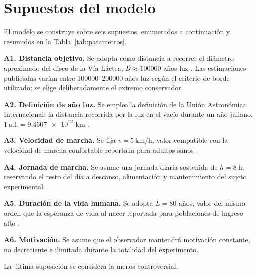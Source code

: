 \documentclass[conference]{IEEEtran}
\begin{document}
\section{Supuestos del modelo}
\label{sec:supuestos}

El modelo se construye sobre seis supuestos, enumerados a continuación y
resumidos en la Tabla~\ref{tab:parametros}.

\textbf{A1. Distancia objetivo.} Se adopta como distancia a recorrer el
diámetro aproximado del disco de la Vía Láctea, $D \approx \num{100000}$ años
luz \cite{nasa_mw,goodwin}. Las estimaciones publicadas varían entre
\numrange{100000}{200000} años luz según el criterio de borde utilizado;
se elige deliberadamente el extremo conservador.

\textbf{A2. Definición de año luz.} Se emplea la definición de la Unión
Astronómica Internacional: la distancia recorrida por la luz en el vacío
durante un año juliano, $1\ \text{a.l.} = \num{9.4607e12}$ km
\cite{iau_style}.

\textbf{A3. Velocidad de marcha.} Se fija $v = \qty{5}{\kilo\meter\per\hour}$,
valor compatible con la velocidad de marcha confortable reportada para adultos
sanos \cite{bohannon}.

\textbf{A4. Jornada de marcha.} Se asume una jornada diaria sostenida de
$h = \qty{8}{\hour}$, reservando el resto del día a descanso, alimentación y
mantenimiento del sujeto experimental.

\textbf{A5. Duración de la vida humana.} Se adopta $L = \num{80}$ años, valor
del mismo orden que la esperanza de vida al nacer reportada para poblaciones
de ingreso alto \cite{who}.

\textbf{A6. Motivación.} Se asume que el observador mantendrá motivación
constante, no decreciente e ilimitada durante la totalidad del experimento.

La última suposición se considera la menos controversial.
\end{document}

